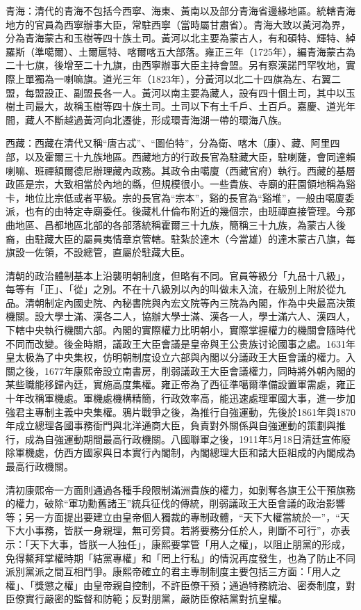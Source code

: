 青海：清代的青海不包括今西寧、海東、黃南以及部分青海省邊緣地區。統轄青海地方的官員為西寧辦事大臣，常駐西寧（當時屬甘肅省）。青海大致以黃河為界，分為青海蒙古和玉樹等四十族土司。黃河以北主要為蒙古人，有和碩特、輝特、綽羅斯（準噶爾）、土爾扈特、喀爾喀五大部落。雍正三年（1725年），編青海蒙古為二十七旗，後增至二十九旗，由西寧辦事大臣主持會盟。另有察漢諾門罕牧地，實際上單獨為一喇嘛旗。道光三年（1823年），分黃河以北二十四旗為左、右翼二盟，每盟設正、副盟長各一人。黃河以南主要為藏人，設有四十個土司，其中以玉樹土司最大，故稱玉樹等四十族土司。土司以下有土千戶、土百戶。嘉慶、道光年間，藏人不斷越過黃河向北遷徙，形成環青海湖一帶的環海八族。

西藏：西藏在清代又稱“唐古忒”、“圖伯特”，分為衛、喀木（康）、藏、阿里四部，以及霍爾三十九族地區。西藏地方的行政長官為駐藏大臣，駐喇薩，會同達賴喇嘛、班禪額爾德尼辦理藏內政務。其政令由噶廈（西藏官府）執行。西藏的基層政區是宗，大致相當於內地的縣，但規模很小。一些貴族、寺廟的莊園領地稱為谿卡，地位比宗低或者平級。宗的長官為“宗本”，谿的長官為“谿堆”，一般由噶廈委派，也有的由特定寺廟委任。後藏札什倫布附近的幾個宗，由班禪直接管理。今那曲地區、昌都地區北部的各部落統稱霍爾三十九族，簡稱三十九族，為蒙古人後裔，由駐藏大臣的屬員夷情章京管轄。駐紮於達木（今當雄）的達木蒙古八旗，每旗設一佐領，不設總管，直屬於駐藏大臣。

清朝的政治體制基本上沿襲明朝制度，但略有不同。官員等級分「九品十八級」，每等有「正」、「從」之別。不在十八級別以內的叫做未入流，在級別上附於從九品。清朝制定內國史院、內秘書院與內宏文院等內三院為內閣，作為中央最高決策機關。設大學士滿、漢各二人，協辦大學士滿、漢各一人，學士滿六人、漢四人，下轄中央執行機關六部。內閣的實際權力比明朝小，實際掌握權力的機關會隨時代不同而改變。後金時期，議政王大臣會議是皇帝與王公贵族讨论國事之處。1631年皇太极為了中央集权，仿明朝制度设立六部與內閣以分議政王大臣會議的權力。入關之後，1677年康熙帝設立南書房，削弱議政王大臣會議權力，同時將外朝內閣的某些職能移歸內廷，實施高度集權。雍正帝為了西征準噶爾準備設置軍需處，雍正十年改稱軍機處。軍機處機構精簡，行政效率高，能迅速處理軍國大事，進一步加強君主專制主義中央集權。鴉片戰爭之後，為推行自強運動，先後於1861年與1870年成立總理各國事務衙門與北洋通商大臣，負責對外關係與自強運動的策劃與推行，成為自強運動期間最高行政機關。八國聯軍之後，1911年5月18日清廷宣佈廢除軍機處，仿西方國家與日本實行內閣制，內閣總理大臣和諸大臣組成的內閣成為最高行政機關。

清初康熙帝一方面則通過各種手段限制滿洲貴族的權力，如剝奪各旗王公干預旗務的權力，破除“軍功勳舊諸王”統兵征伐的傳統，削弱議政王大臣會議的政治影響等；另一方面提出要建立由皇帝個人獨裁的專制政體，“天下大權當統於一”，“天下大小事務，皆朕一身親理，無可旁貸。若將要務分任於人，則斷不可行”，亦表示：「天下大事，皆朕一人独任」，康熙要掌管「用人之權」，以阻止朋黨的形成，免得鰲拜掌權時期「結黨專權」和「罔上行私」的情況再度發生，也為了防止不同派別黨派之間互相鬥爭。康熙帝確立的君主專制制度主要包括三方面：「用人之權」、「獎懲之權」由皇帝親自控制，不許臣僚干預；通過特務統治、密奏制度，對臣僚實行嚴密的監督和防範；反對朋黨，嚴防臣僚結黨對抗皇權。

